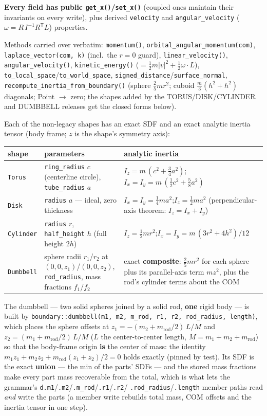 \documentclass[11pt]{article}
\newcommand{\code}[1]{\texttt{#1}}
\begin{document}
\textbf{Every field has public \code{get\_x()}/\code{set\_x()}} (coupled
ones maintain their invariants on every write), plus derived
\code{velocity} and \code{angular\_velocity}
($\omega = R\,I^{-1}R^{\mathsf T}L$) properties.

Methods carried over verbatim: \code{momentum()},
\code{orbital\_angular\_momentum(com)}, \code{laplace\_vector(com, k)}
(incl.\ the $r=0$ guard), \code{linear\_velocity()},
\code{angular\_velocity()}, \code{kinetic\_energy()}
($=\tfrac12 m|v|^2+\tfrac12\omega\cdot L$),
\code{to\_local\_space}/\code{to\_world\_space},
\code{signed\_distance}/\code{surface\_normal},
\code{recompute\_inertia\_from\_boundary()} (sphere $\tfrac25 mr^2$;
cuboid $\tfrac m3(h^2{+}h^2)$ diagonals; Point $\to$ zero; the shapes
added by the TORUS/DISK/CYLINDER and DUMBBELL releases get the closed
forms below).

Each of the non-legacy shapes has an exact SDF and an exact analytic
inertia tensor (body frame; $z$ is the shape's symmetry axis):

\begin{center}
\begin{tabular}{lp{4.6cm}p{6.4cm}}
\textbf{shape} & \textbf{parameters} & \textbf{analytic inertia}\\\hline
\code{Torus} & \code{ring\_radius} $c$ (centerline circle), \code{tube\_radius} $a$ & $I_z = m\,(c^2 + \tfrac34 a^2)$;\quad $I_x = I_y = m\,(\tfrac12 c^2 + \tfrac58 a^2)$\\
\code{Disk} & \code{radius} $a$ --- ideal, zero thickness & $I_x = I_y = \tfrac14 m a^2$;\quad $I_z = \tfrac12 m a^2$ (perpendicular-axis theorem: $I_z = I_x + I_y$)\\
\code{Cylinder} & \code{radius} $r$, \code{half\_height} $h$ (full height $2h$) & $I_z = \tfrac12 m r^2$;\quad $I_x = I_y = m\,(3r^2 + 4h^2)/12$\\
\code{Dumbbell} & sphere radii $r_1$/$r_2$ at $(0,0,z_1)$/$(0,0,z_2)$, \code{rod\_radius}, mass fractions $f_1$/$f_2$ & exact \textbf{composite}: $\tfrac25 m r^2$ for each sphere plus its parallel-axis term $m z^2$, plus the rod's cylinder terms about the COM\\
\end{tabular}
\end{center}

The dumbbell --- two solid spheres joined by a solid rod, \textbf{one}
rigid body --- is built by
\code{boundary::dumbbell(m1, m2, m\_rod, r1, r2, rod\_radius, length)},
which places the sphere offsets at
$z_1 = -(m_2 + m_{\mathrm{rod}}/2)\,L/M$ and
$z_2 = (m_1 + m_{\mathrm{rod}}/2)\,L/M$ ($L$ the center-to-center
length, $M = m_1 + m_2 + m_{\mathrm{rod}}$) so that the body-frame
origin \textbf{is} the center of mass: the identity
$m_1 z_1 + m_2 z_2 + m_{\mathrm{rod}}(z_1 + z_2)/2 = 0$ holds exactly
(pinned by test). Its SDF is the exact \textbf{union} --- the min of
the parts' SDFs --- and the stored mass fractions make every part mass
recoverable from the total, which is what lets the grammar's
\code{d.m1}/\code{.m2}/\code{.m\_rod}/\code{.r1}/\code{.r2}/%
\code{.rod\_radius}/\code{.length} member paths read \emph{and} write
the parts (a member write rebuilds total mass, COM offsets and the
inertia tensor in one step).
\end{document}
